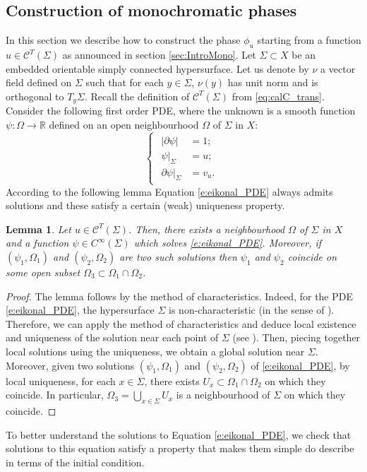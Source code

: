 \documentclass[JEP,XML,SOM,Unicode,published]{cedram}
\let\mathcal\mathscr
\theoremstyle{plain}
\newtheorem{lemma}[theorem]{Lemma}
\theoremstyle{definition}
\newcommand{\R}{\mathbb{R}}
\def\calC{\mathcal{C}}
\begin{document}
\begin{appendix}
\section{Construction of monochromatic phases}\label{sec:AppMono}
In this section we describe how to construct the phase $\phi_u$ starting from a function $u\in\calC^T(\Sigma)$ as announced in section \ref{sec:IntroMono}. Let $\Sigma\subset X$ be an embedded orientable simply connected hypersurface. Let us denote by $\nu$ a vector field defined on $\Sigma$ such that for each $y\in\Sigma$, $\nu(y)$ has unit norm and is orthogonal to $T_y\Sigma$. Recall the definition of $\mathcal{C}^T(\Sigma)$ from \eqref{eq:calC_trans}. Consider the following first order PDE, where the unknown is a smooth function $\psi:\Omega\to\R$ defined on an open neighbourhood $\Omega$ of $\Sigma$ in $X$:\vspace*{-2pt}
\begin{equation}\label{e:eikonal_PDE}
\begin{cases}
\begin{array}{rl}
|\partial\psi| &=1;\\
\psi|_\Sigma &=u;\\
\partial\psi|_\Sigma &=v_u.
\end{array}
\end{cases}
\end{equation}
According to the following lemma Equation \eqref{e:eikonal_PDE} always admits solutions and these satisfy a certain (weak) uniqueness property.
\begin{lemma}\label{l:existence_uniqueness}
Let $u\in\calC^T(\Sigma)$. Then, there exists a neighbourhood $\Omega$ of $\Sigma$ in $X$ and a function $\psi\in C^\infty(\Sigma)$ which solves \eqref{e:eikonal_PDE}. Moreover, if $(\psi_1,\Omega_1)$ and $(\psi_2,\Omega_2)$ are two such solutions then $\psi_1$ and $\psi_2$ coincide on some open subset $\Omega_3\subset\Omega_1\cap\Omega_2$.
\end{lemma}

\begin{proof}
The lemma follows by the method of characteristics. Indeed, for the PDE \eqref{e:eikonal_PDE}, the hypersurface $\Sigma$ is non-characteristic (in the sense of \cite[(36) p.\,106]{Evans}). Therefore, we can apply the method of characteristics and deduce local existence and uniqueness of the solution near each point of $\Sigma$ (see \cite{Evans}). Then, piecing together local solutions using the uniqueness, we obtain a global solution near $\Sigma$. Moreover, given two solutions $(\psi_1,\Omega_1)$ and $(\psi_2,\Omega_2)$ of \eqref{e:eikonal_PDE}, by local uniqueness, for each $x\in\Sigma$, there exists $U_x\subset\Omega_1\cap\Omega_2$ on which they coincide. In particular, $\Omega_3=\bigcup_{x\in\Sigma} U_x$ is a neighbourhood of $\Sigma$ on which they coincide.
\end{proof}
To better understand the solutions to Equation \eqref{e:eikonal_PDE}, we check that solutions to this equation satisfy a property that makes them simple do describe in terms of the initial condition.


\end{appendix}
\end{document}
